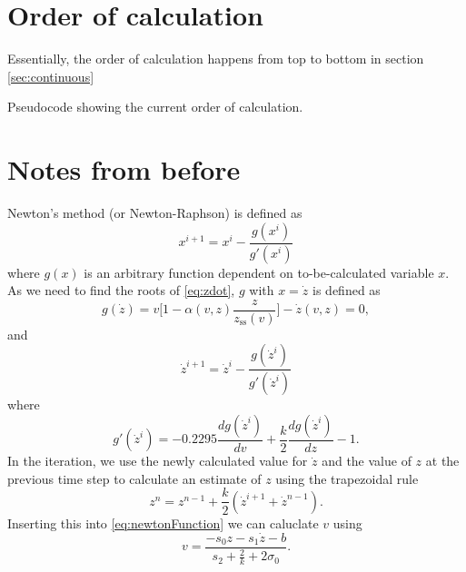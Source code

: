 \documentclass{article}
\begin{document}
\section{Order of calculation}
Essentially, the order of calculation happens from top to bottom in section \ref{sec:continuous}
\begin{algorithm}[h]\label{alg:calcOrder}
 \caption{Pseudocode showing the current order of calculation.}
\end{algorithm}

\section{Notes from before}
Newton's method (or Newton-Raphson) is defined as
\begin{equation}
    x^{i+1} = x^{i} - \frac{g(x^i)}{g'(x^i)}
\end{equation}
where $g(x)$ is an arbitrary function dependent on to-be-calculated variable $x$.
As we need to find the roots of \eqref{eq:zdot}, $g$ with $x=\dot z$ is defined as
\begin{equation}
   g(\dot z) = v\bigg[1-\alpha(v, z)\frac{z}{z_\text{ss}(v)}\bigg] -  \dot z(v,z) = 0,
\end{equation}
and
\begin{equation}
    \dot z^{i+1} = \dot z^i - \frac{g(\dot z^i)}{g'(\dot z^i)}
\end{equation}
where
\begin{equation}
    g'(\dot z^i) = -0.2295\frac{dg(\dot z^i)}{dv} + \frac{k}{2}\frac{dg(\dot z^i)}{dz} - 1.
\end{equation}
In the iteration, we use the newly calculated value for $\dot z$ and the value of $z$ at the previous time step to calculate an estimate of $z$ using the trapezoidal rule
\begin{equation}
    z^n = z^{n-1} + \frac{k}{2}(\dot z^{i+1} + \dot z^{n-1}).
\end{equation}
Inserting this into \eqref{eq:newtonFunction} we can caluclate $v$ using
\begin{equation}
    v = \frac{-s_0z-s_1\dot z-b}{s_2 + \frac{2}{k} + 2\sigma_0}.
\end{equation}
\end{document}
